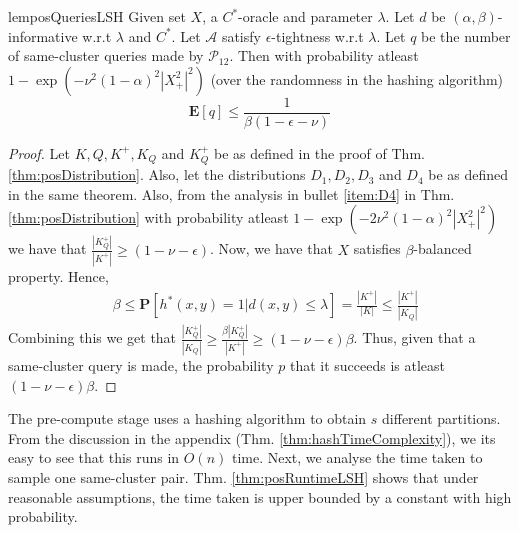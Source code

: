 \documentclass[12pt]{article}
\newcommand{\mb}{\mathbf}
\newcommand{\mc}{\mathcal}
\begin{document}
\begin{restatable}{lem}{posQueriesLSH}
\label{lemma:posQueriesLSH}
Given set $X$, a $C^*$-oracle and parameter $\lambda$. Let $d$ be $(\alpha, \beta)$-informative w.r.t $\lambda$ and $C^*$. Let $\mc A$ satisfy $\epsilon$-tightness w.r.t $\lambda$. Let $q$ be the number of same-cluster queries made by $\mc P_{12}$. Then with probability atleast $1-\exp(-\nu^2(1-\alpha)^2|X^2_+|^2)$ (over the randomness in the hashing algorithm) $$\mb E[q] \le \frac{1}{\beta(1-\epsilon-\nu)}$$ 
\end{restatable}
\begin{proof}
Let $K, Q, K^+, K_Q$ and $K_Q^+$ be as defined in the proof of Thm. \ref{thm:posDistribution}. Also, let the distributions $D_1, D_2, D_3$ and $D_4$ be as defined in the same theorem. Also, from the analysis in bullet \ref{item:D4} in Thm. \ref{thm:posDistribution} with probability atleast $1 - \exp(-2\nu^2(1-\alpha)^2|X^2_+|^2)$ we have that $\frac{|K_Q^+|}{|K^+|} \ge (1-\nu-\epsilon)$. Now, we have that $X$ satisfies $\beta$-balanced property. Hence,
\begin{align*}
  &\beta \le \mb P[h^*(x, y) = 1 | d(x, y) \le \lambda] = \frac{|K^+|}{|K|} \le \frac{|K^+|}{|K_Q|}
\end{align*}
Combining this we get that $\frac{|K_Q^+|}{|K_Q|} \ge \frac{\beta|K_Q^+|}{|K^+|} \ge (1-\nu-\epsilon)\beta$. Thus, given that a same-cluster query is made, the probability $p$ that it succeeds is atleast $(1-\nu-\epsilon)\beta$.
\end{proof}

The pre-compute stage uses a hashing algorithm to obtain $s$ different partitions. From the discussion in the appendix (Thm. \ref{thm:hashTimeComplexity}), we its easy to see that this runs in $O(n)$ time. Next, we  analyse the time taken to sample one same-cluster pair.  Thm. \ref{thm:posRuntimeLSH} shows that under reasonable assumptions, the time taken is upper bounded by a constant with high probability. 
\end{document}
